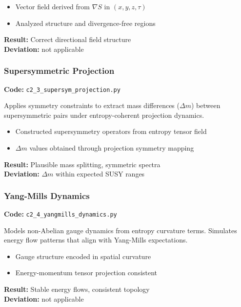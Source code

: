 \documentclass[10.5pt,a4paper]{article}
\begin{document}
\begin{itemize}
    \item Vector field derived from \(\nabla S\) in \((x,y,z,\tau)\)
    \item Analyzed structure and divergence-free regions
\end{itemize}

\noindent\textbf{Result:} Correct directional field structure\\
\textbf{Deviation:} not applicable

\subsubsection{Supersymmetric Projection}

\noindent\textbf{Code:} \texttt{c2\_3\_supersym\_projection.py}

Applies symmetry constraints to extract mass differences (\(\Delta m\)) between supersymmetric pairs under entropy-coherent projection dynamics.

\begin{itemize}
    \item Constructed supersymmetry operators from entropy tensor field
    \item \(\Delta m\) values obtained through projection symmetry mapping
\end{itemize}

\noindent\textbf{Result:} Plausible mass splitting, symmetric spectra\\
\textbf{Deviation:} \(\Delta m\) within expected SUSY ranges

\subsubsection{Yang-Mills Dynamics}

\noindent\textbf{Code:} \texttt{c2\_4\_yangmills\_dynamics.py}

Models non-Abelian gauge dynamics from entropy curvature terms. Simulates energy flow patterns that align with Yang-Mills expectations.

\begin{itemize}
    \item Gauge structure encoded in spatial curvature
    \item Energy-momentum tensor projection consistent
\end{itemize}

\noindent\textbf{Result:} Stable energy flows, consistent topology\\
\textbf{Deviation:} not applicable
\end{document}
